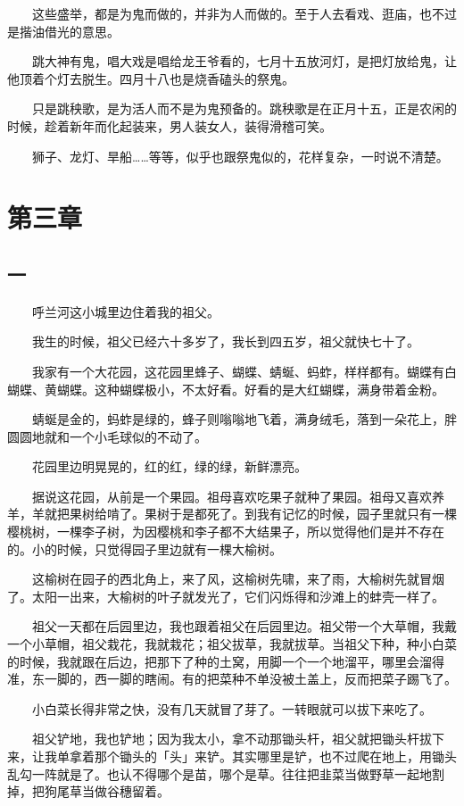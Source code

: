 \documentclass[UTF8]{ctexart}
\begin{document}
　　这些盛举，都是为鬼而做的，并非为人而做的。至于人去看戏、逛庙，也不过是揩油借光的意思。

　　跳大神有鬼，唱大戏是唱给龙王爷看的，七月十五放河灯，是把灯放给鬼，让他顶着个灯去脱生。四月十八也是烧香磕头的祭鬼。

　　只是跳秧歌，是为活人而不是为鬼预备的。跳秧歌是在正月十五，正是农闲的时候，趁着新年而化起装来，男人装女人，装得滑稽可笑。

　　狮子、龙灯、旱船……等等，似乎也跟祭鬼似的，花样复杂，一时说不清楚。

\section{第三章}

\subsection{一}

　　呼兰河这小城里边住着我的祖父。

　　我生的时候，祖父已经六十多岁了，我长到四五岁，祖父就快七十了。

　　我家有一个大花园，这花园里蜂子、蝴蝶、蜻蜒、蚂蚱，样样都有。蝴蝶有白蝴蝶、黄蝴蝶。这种蝴蝶极小，不太好看。好看的是大红蝴蝶，满身带着金粉。

　　蜻蜒是金的，蚂蚱是绿的，蜂子则嗡嗡地飞着，满身绒毛，落到一朵花上，胖圆圆地就和一个小毛球似的不动了。

　　花园里边明晃晃的，红的红，绿的绿，新鲜漂亮。

　　据说这花园，从前是一个果园。祖母喜欢吃果子就种了果园。祖母又喜欢养羊，羊就把果树给啃了。果树于是都死了。到我有记忆的时候，园子里就只有一棵樱桃树，一棵李子树，为因樱桃和李子都不大结果子，所以觉得他们是并不存在的。小的时候，只觉得园子里边就有一棵大榆树。

　　这榆树在园子的西北角上，来了风，这榆树先啸，来了雨，大榆树先就冒烟了。太阳一出来，大榆树的叶子就发光了，它们闪烁得和沙滩上的蚌壳一样了。

　　祖父一天都在后园里边，我也跟着祖父在后园里边。祖父带一个大草帽，我戴一个小草帽，祖父栽花，我就栽花；祖父拔草，我就拔草。当祖父下种，种小白菜的时候，我就跟在后边，把那下了种的土窝，用脚一个一个地溜平，哪里会溜得准，东一脚的，西一脚的瞎闹。有的把菜种不单没被土盖上，反而把菜子踢飞了。

　　小白菜长得非常之快，没有几天就冒了芽了。一转眼就可以拔下来吃了。

　　祖父铲地，我也铲地；因为我太小，拿不动那锄头杆，祖父就把锄头杆拔下来，让我单拿着那个锄头的「头」来铲。其实哪里是铲，也不过爬在地上，用锄头乱勾一阵就是了。也认不得哪个是苗，哪个是草。往往把韭菜当做野草一起地割掉，把狗尾草当做谷穗留着。
\end{document}
